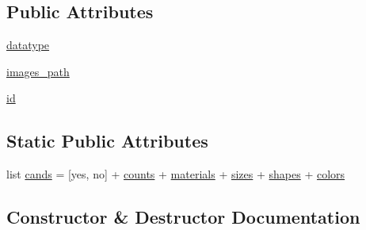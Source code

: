 \subsection*{Public Attributes}
\begin{DoxyCompactItemize}
\item 
\hyperlink{classparlai_1_1tasks_1_1clevr_1_1agents_1_1DefaultTeacher_a7bdb21c7cb0d04c3470c069125ea3d4a}{datatype}
\item 
\hyperlink{classparlai_1_1tasks_1_1clevr_1_1agents_1_1DefaultTeacher_a524bed88c209582a3ccdc7693ba08214}{images\+\_\+path}
\item 
\hyperlink{classparlai_1_1tasks_1_1clevr_1_1agents_1_1DefaultTeacher_ab936a3d7fc5e5249495d9a42a30d0708}{id}
\end{DoxyCompactItemize}
\subsection*{Static Public Attributes}
\begin{DoxyCompactItemize}
\item 
list \hyperlink{classparlai_1_1tasks_1_1clevr_1_1agents_1_1DefaultTeacher_ac6422c7d4dc173edcbafae2ce5f2552b}{cands} = \mbox{[}\textquotesingle{}yes\textquotesingle{}, \textquotesingle{}no\textquotesingle{}\mbox{]} + \hyperlink{namespaceparlai_1_1tasks_1_1clevr_1_1agents_addbc9f5c2379e29136fbbf55b1dfb333}{counts} + \hyperlink{namespaceparlai_1_1tasks_1_1clevr_1_1agents_a73f08794aae5cb7c2a5cc9d1d662e082}{materials} + \hyperlink{namespaceparlai_1_1tasks_1_1clevr_1_1agents_a565c7b5d57a9f93a062d7a130f6ba989}{sizes} + \hyperlink{namespaceparlai_1_1tasks_1_1clevr_1_1agents_ac54e3cd91825301baef61b929e13c0b4}{shapes} + \hyperlink{namespaceparlai_1_1tasks_1_1clevr_1_1agents_a18c5435aea4ab46265cd4c70c7f04718}{colors}
\end{DoxyCompactItemize}


\subsection{Constructor \& Destructor Documentation}
\mbox{\label{classparlai_1_1tasks_1_1clevr_1_1agents_1_1DefaultTeacher_a6b201b7448a18fbc9c75ffd75ed6febb}} 
